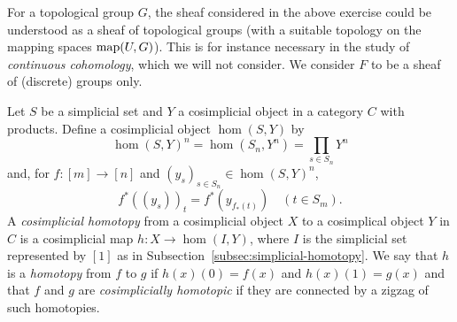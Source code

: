 \documentclass[a4paper,openany]{scrbook}
\begin{document}
\begin{remark}
For a topological group $G$, the sheaf considered in the above exercise could be understood as a sheaf of topological groups (with a suitable topology on the mapping spaces $\operatorname{map}(U,G)$). This is for instance necessary in the study of \emph{continuous cohomology}, which we will not consider. We consider $F$ to be a sheaf of (discrete) groups only.
\end{remark}

\begin{defn}
Let $S$ be a simplicial set and $Y$ a cosimplicial object in a category $C$ with products. Define a cosimplicial object $\hom(S,Y)$ by
\[
\hom(S,Y)^n = \hom(S_n,Y^n) = \prod_{s \in S_n} Y^n
\]
and, for $f\colon [m] \to [n]$ and $(y_s)_{s \in S_n} \in \hom(S,Y)^n$,
\[
f^*((y_s))_t = f^*(y_{f_*(t)}) \quad (t \in S_{m}).
\]
A \emph{cosimplicial homotopy} from a cosimplicial object $X$ to a cosimplical object $Y$ in $C$ is a cosimplicial map $h\colon X \to \hom(I,Y)$, where $I$ is the simplicial set represented by $[1]$ as in Subsection~\ref{subsec:simplicial-homotopy}. We say that $h$ is a \textit{homotopy} from $f$ to $g$ if $h(x)(0)=f(x)$ and $h(x)(1)=g(x)$ and that $f$ and $g$ are \emph{cosimplicially homotopic} if they are connected by a zigzag of such homotopies. 
\end{defn}
\end{document}
